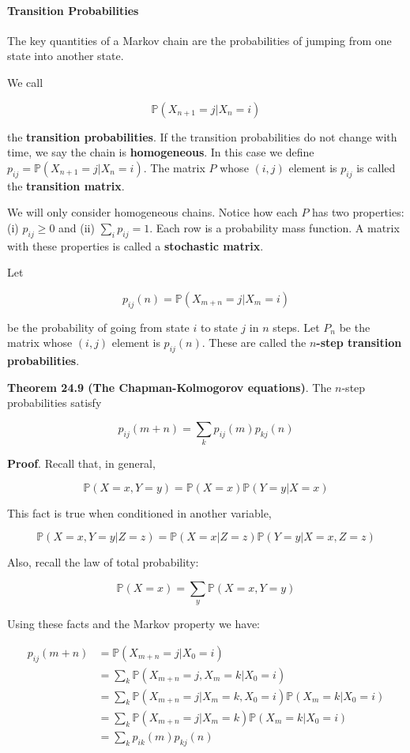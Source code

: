 \paragraph{Transition Probabilities}\label{transition-probabilities}

The key quantities of a Markov chain are the probabilities of jumping
from one state into another state.

We call

\[ \mathbb{P}(X_{n+1} = j | X_n = i) \]

the \textbf{transition probabilities}. If the transition probabilities
do not change with time, we say the chain is \textbf{homogeneous}. In
this case we define \(p_{ij} = \mathbb{P}(X_{n+1} = j | X_n = i)\). The
matrix \(P\) whose \((i, j)\) element is \(p_{ij}\) is called the
\textbf{transition matrix}.

We will only consider homogeneous chains. Notice how each \(P\) has two
properties: (i) \(p_{ij} \geq 0\) and (ii) \(\sum_i p_{ij} = 1\). Each
row is a probability mass function. A matrix with these properties is
called a \textbf{stochastic matrix}.

Let

\[ p_{ij}(n) = \mathbb{P}(X_{m + n} = j | X_{m} = i) \]

be the probability of going from state \(i\) to state \(j\) in \(n\)
steps. Let \(P_n\) be the matrix whose \((i, j)\) element is
\(p_{ij}(n)\). These are called the \textbf{\(n\)-step transition
probabilities}.

\textbf{Theorem 24.9 (The Chapman-Kolmogorov equations)}. The \(n\)-step
probabilities satisfy

\[ p_{ij}(m + n) = \sum_k p_{ij}(m) p_{kj}(n) \]

\textbf{Proof}. Recall that, in general,

\[ \mathbb{P}(X = x, Y = y) = \mathbb{P}(X = x) \mathbb{P}(Y = y | X = x) \]

This fact is true when conditioned in another variable,

\[ \mathbb{P}(X = x, Y = y | Z = z) = \mathbb{P}(X = x | Z = z) \mathbb{P}(Y = y | X = x, Z = z) \]

Also, recall the law of total probability:

\[ \mathbb{P}(X = x) = \sum_y \mathbb{P}(X = x, Y = y) \]

Using these facts and the Markov property we have:

\[
\begin{align}
p_{ij}(m + n) &= \mathbb{P}(X_{m + n} = j | X_0 = i) \\
&= \sum_k \mathbb{P}(X_{m + n} = j, X_m = k | X_0 = i) \\
&= \sum_k \mathbb{P}(X_{m + n} = j | X_m = k, X_0 = i) \mathbb{P}(X_m = k | X_0 = i) \\
&= \sum_k \mathbb{P}(X_{m + n} = j | X_m = k) \mathbb{P}(X_m = k | X_0 = i) \\
&= \sum_k p_{ik}(m) p_{kj}(n)
\end{align}
\]

